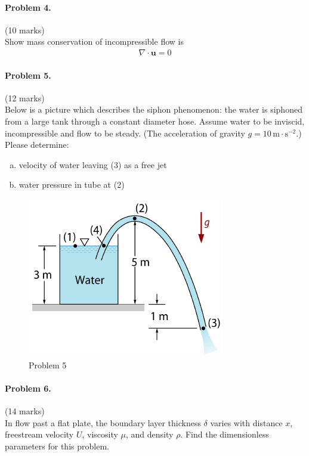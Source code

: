 \documentclass[12pt]{article}
\begin{document}
\bigskip
\paragraph{Problem 4.}\hfill (10 marks)\\
Show mass conservation of  incompressible flow is
\begin{align*}
\nabla \cdot \mathbf{u}=0
\end{align*}


\paragraph{Problem 5.}\hfill (12 marks)\\
Below is a picture which describes the siphon phenomenon: the water is siphoned from a large tank through a constant diameter hose. Assume water to be inviscid, incompressible and flow to be steady. (The acceleration of gravity $g=\mathrm{10 \, m\cdot s^{-2}}$.) Please determine:
\begin{enumerate}[(a)]
	\item
	velocity of water leaving (3) as a free jet
	\item
	water pressure in tube at (2)
\end{enumerate}
\begin{figure}[hb]
	\centering
	\includegraphics[width=0.5\linewidth]{"figs/problem 5"}
	\caption{Problem 5}
	\label{fig:problem-5}
\end{figure}


\newpage
\paragraph{Problem 6.}\hfill (14 marks)\\
In flow past a flat plate, the boundary layer thickness $\delta$ varies with distance $x$, freestream velocity $U$, viscosity $\mu$, and density $\rho$. Find the dimensionless parameters for this problem.
\end{document}

